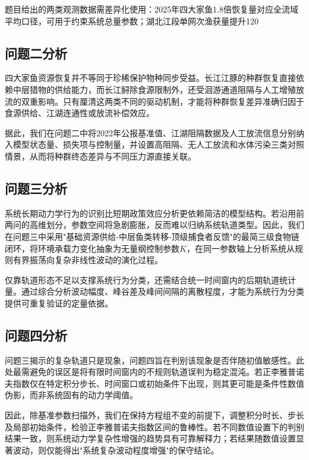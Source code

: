 \documentclass{MMCStyle}
\begin{document}
题目给出的两类观测数据需差异化使用：2025年四大家鱼1.8倍恢复量对应全流域平均口径，可用于约束系统总量参数；湖北江段单网次渔获量提升120%

\subsection{问题二分析}
四大家鱼资源恢复并不等同于珍稀保护物种同步受益。长江江豚的种群恢复直接依赖中层猎物的供给能力，而长江鲟除食源限制外，还受洄游通道阻隔与人工增殖放流的双重影响。只有厘清这两类不同的驱动机制，才能将种群恢复差异准确归因于食源供给、江湖连通性或放流补偿效应。

据此，我们在问题二中将2022年公报基准值、江湖阻隔数据及人工放流信息分别纳入模型状态量、损失项与控制量，并设置高阻隔、无人工放流和水体污染三类对照情景，从而将种群终态差异与不同压力源直接关联。

\subsection{问题三分析}
系统长期动力学行为的识别比短期政策效应分析更依赖简洁的模型结构。若沿用前两问的高维划分，参数空间将急剧膨胀，反而难以归纳系统轨道类型。因此，我们在问题三中采用"基础资源供给-中层鱼类转移-顶级捕食者反馈"的最简三级食物链闭环，将环境承载力变化抽象为无量纲控制参数$K$，在同一参数轴上分析系统从规则有界振荡向复杂非线性波动的演化过程。

仅靠轨道形态不足以支撑系统行为分类，还需结合统一时间窗内的后期轨道统计量。通过综合分析波动幅度、峰谷差及峰间间隔的离散程度，才能为系统行为分类提供可重复验证的定量依据。

\subsection{问题四分析}
问题三揭示的复杂轨道只是现象，问题四旨在判别该现象是否伴随初值敏感性。此处最需避免的误区是将有限时间窗内的不规则轨道误判为稳定混沌。若正李雅普诺夫指数仅在特定积分步长、时间窗口或初始条件下出现，则其更可能是条件性数值伪影，而非系统固有的动力学阈值。

因此，除基准参数扫描外，我们在保持方程组不变的前提下，调整积分时长、步长及局部初始条件，检验正李雅普诺夫指数区间的鲁棒性。若不同数值设置下的判别结果一致，则系统动力学复杂性增强的趋势具有可靠解释力；若结果随数值设置显著波动，则仅能得出"系统复杂波动程度增强"的保守结论。
\end{document}
